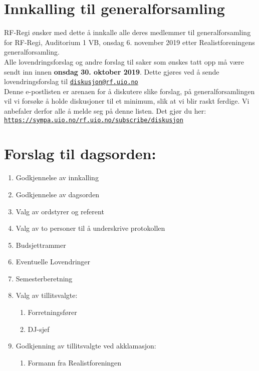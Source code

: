 \documentclass[a4paper]{article}
\begin{document}
\section*{\textsf{\textbf{\huge Innkalling til generalforsamling}}}
\vspace{1cm}

RF-Regi ønsker med dette å innkalle alle deres medlemmer til generalforsamling
for RF-Regi, Auditorium 1 VB, onsdag 6. november 2019 etter
    Realistforeningens generalforsamling. \\

Alle lovendringsforslag og andre forslag til saker som ønskes tatt opp må
være sendt inn innen \textbf{onsdag 30. oktober 2019}. Dette gjøres ved å sende
lov\-endringsforslag til
\href{mailto:diskusjon@rf.uio.no}{\texttt{diskusjon@rf.uio.no}} \\

Denne e-postlisten er arenaen for å diskutere slike forslag, på general\-forsamlingen vil vi
forsøke å holde diskusjoner til et minimum, slik at vi blir raskt ferdige.
Vi anbefaler derfor alle å melde seg på denne listen. Det gjør du her:\\
\texttt{\url{https://sympa.uio.no/rf.uio.no/subscribe/diskusjon}}\\

\section*{\textsf{Forslag til dagsorden:}}
\begin{enumerate}
    \item Godkjennelse av innkalling
    \item Godkjennelse av dagsorden
    \item Valg av ordstyrer og referent
    \item Valg av to personer til å underskrive protokollen
    \item Budsjettrammer
    \item Eventuelle Lovendringer
    \item Semesterberetning
    \item Valg av tillitsvalgte:
    \begin{enumerate}
      \item Forretningsfører
      \item DJ-sjef
    \end{enumerate}
    \item Godkjenning av tillitsvalgte ved akklamasjon:
    \begin{enumerate}
        \item Formann fra Realistforeningen
    \end{enumerate}
\end{enumerate}
\end{document}
